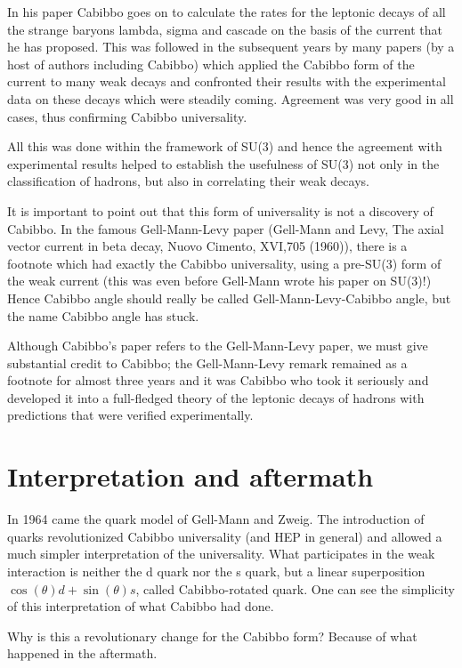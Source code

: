 In his paper Cabibbo goes on to calculate the rates
for the leptonic decays of all the strange baryons lambda,
sigma and cascade on the basis of the current that he has
proposed. This was followed in the subsequent years by 
many papers (by a host of authors including Cabibbo)
which applied the Cabibbo form of the current
to many weak decays and confronted their results with the
experimental data on these decays which were steadily coming.
Agreement was very good in all cases, thus confirming 
Cabibbo universality.

All this was done within the framework of SU(3) and hence
the agreement with experimental results helped to establish
the usefulness of SU(3) not only in the classification of
hadrons, but also in correlating their weak decays. 

It is important to point out that this form of universality
is not a discovery of Cabibbo. In the famous Gell-Mann-Levy
paper (Gell-Mann and Levy, The axial vector current in beta
decay, Nuovo Cimento, XVI,705 (1960)), there is a footnote
which had exactly the Cabibbo universality, using a pre-SU(3)
form of the weak current (this was even before Gell-Mann wrote
his paper on SU(3)!) Hence Cabibbo angle should really be
called Gell-Mann-Levy-Cabibbo angle, but the name Cabibbo
angle has stuck.

Although Cabibbo's paper refers to the Gell-Mann-Levy paper,
we must give substantial credit to Cabibbo; the Gell-Mann-Levy 
remark remained as a footnote for almost three years 
and it was Cabibbo who took it seriously and developed it 
into a full-fledged theory of the leptonic decays of hadrons 
with predictions that were verified experimentally.

\section*{Interpretation and aftermath}

In 1964 came the quark model of Gell-Mann and Zweig. The
introduction of quarks revolutionized Cabibbo universality
(and HEP in general) and allowed a much simpler interpretation
of the universality. What participates in the weak interaction 
is neither the d quark nor the s quark, but a linear superposition
$\cos(\theta)d + \sin(\theta)s$, called Cabibbo-rotated quark. 
One can see the simplicity of this interpretation of what 
Cabibbo had done.

Why is this a revolutionary change for the Cabibbo form? Because
of what happened in the aftermath.

